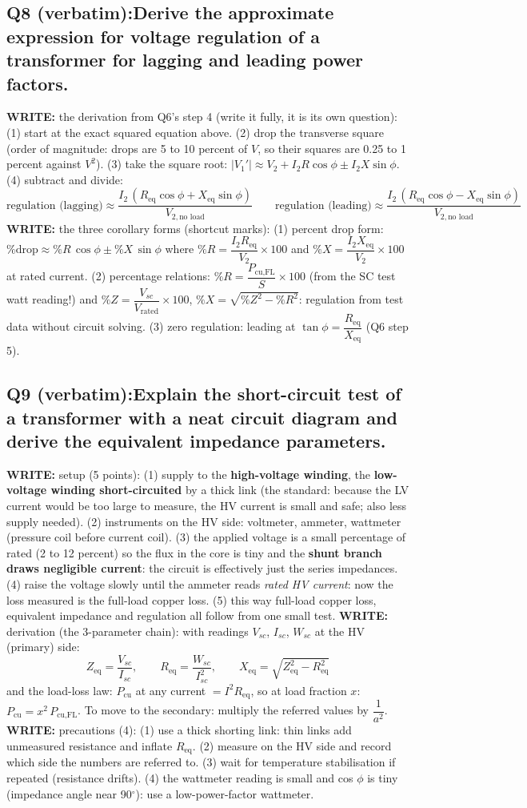 \documentclass[11pt]{article}
\newcommand{\q}[2]{\subsection*{\color{copper}#1\quad\color{iron}#2}}
\newcommand{\w}[1]{\textbf{\color{copper}WRITE:} #1}
\begin{document}
\q{Q8 (verbatim):}{Derive the approximate expression for voltage regulation of a transformer for lagging and leading power factors.}
\w{the derivation from Q6's step 4 (write it fully, it is its own question):} (1) start at the exact squared equation above. (2) drop the transverse square (order of magnitude: drops are 5 to 10 percent of $V$, so their squares are 0.25 to 1 percent against $V^{2}$). (3) take the square root: $|V_1'| \approx V_2 + I_2 R \cos\phi \pm I_2 X \sin\phi$. (4) subtract and divide:
\[
\boxed{\text{regulation (lagging)} \approx \dfrac{I_2\,(R_{\text{eq}} \cos\phi + X_{\text{eq}} \sin\phi)}{V_{2,\text{no load}}}}
\qquad
\boxed{\text{regulation (leading)} \approx \dfrac{I_2\,(R_{\text{eq}} \cos\phi - X_{\text{eq}} \sin\phi)}{V_{2,\text{no load}}}}
\]
\w{the three corollary forms (shortcut marks):} (1) percent drop form: $\% \text{drop} \approx \% R\, \cos\phi \pm \% X\, \sin\phi$ where $\% R = \dfrac{I_2 R_{\text{eq}}}{V_2} \times 100$ and $\% X = \dfrac{I_2 X_{\text{eq}}}{V_2} \times 100$ at rated current. (2) percentage relations: $\% R = \dfrac{P_{\text{cu,FL}}}{S} \times 100$ (from the SC test watt reading!) and $\% Z = \dfrac{V_{sc}}{V_{\text{rated}}} \times 100$, $\% X = \sqrt{\% Z^{2} - \% R^{2}}$: regulation from test data without circuit solving. (3) zero regulation: leading at $\tan\phi = \dfrac{R_{\text{eq}}}{X_{\text{eq}}}$ (Q6 step 5).

\q{Q9 (verbatim):}{Explain the short-circuit test of a transformer with a neat circuit diagram and derive the equivalent impedance parameters.}
\w{setup (5 points):} (1) supply to the \textbf{high-voltage winding}, the \textbf{low-voltage winding short-circuited} by a thick link (the standard: because the LV current would be too large to measure, the HV current is small and safe; also less supply needed). (2) instruments on the HV side: voltmeter, ammeter, wattmeter (pressure coil before current coil). (3) the applied voltage is a small percentage of rated (2 to 12 percent) so the flux in the core is tiny and the \textbf{shunt branch draws negligible current}: the circuit is effectively just the series impedances. (4) raise the voltage slowly until the ammeter reads \emph{rated HV current}: now the loss measured is the full-load copper loss. (5) this way full-load copper loss, equivalent impedance and regulation all follow from one small test.
\w{derivation (the 3-parameter chain):} with readings $V_{sc}$, $I_{sc}$, $W_{sc}$ at the HV (primary) side:
\[
Z_{\text{eq}} = \dfrac{V_{sc}}{I_{sc}}, \qquad
R_{\text{eq}} = \dfrac{W_{sc}}{I_{sc}^{2}}, \qquad
X_{\text{eq}} = \sqrt{Z_{\text{eq}}^{2} - R_{\text{eq}}^{2}}
\]
and the load-loss law: $P_{\text{cu}}$ at any current $= I^{2} R_{\text{eq}}$, so at load fraction $x$: $P_{\text{cu}} = x^{2}\, P_{\text{cu,FL}}$. To move to the secondary: multiply the referred values by $\dfrac{1}{a^{2}}$.
\w{precautions (4):} (1) use a thick shorting link: thin links add unmeasured resistance and inflate $R_{\text{eq}}$. (2) measure on the HV side and record which side the numbers are referred to. (3) wait for temperature stabilisation if repeated (resistance drifts). (4) the wattmeter reading is small and cos $\phi$ is tiny (impedance angle near 90$^\circ$): use a low-power-factor wattmeter.
\end{document}
